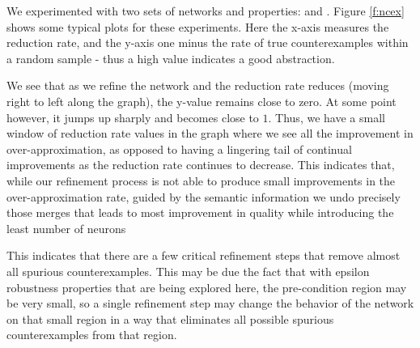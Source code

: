 We experimented with two sets of networks and properties: \mnist and \acasxu.
Figure \ref{f:ncex} shows some typical plots
for these experiments. Here the x-axis measures the reduction rate, and the
y-axis one minus the rate of true counterexamples within a random sample - thus
a high value indicates a good abstraction.

 We see that as we refine the
network and the reduction rate reduces (moving right to left along the graph),
the y-value remains close to zero. At some point however, it jumps up
sharply and becomes close to $1$. Thus, we have a small window of reduction rate
values in the graph where we see all the improvement in over-approximation, as
opposed to having a lingering tail of continual improvements as the reduction
rate continues to decrease.
This indicates that, while our refinement process is not able to produce small
improvements in the over-approximation rate, guided by the semantic information
we undo precisely those merges that leads to most improvement in quality while
introducing the least number of neurons 

This indicates that there are a few
critical refinement steps that remove almost all spurious counterexamples. This
may be due the fact that with epsilon robustness properties that are being
explored here, the pre-condition region may be very small, so a single
refinement step may change the behavior of the network on that small region in a
way that eliminates all possible spurious counterexamples from that region.

